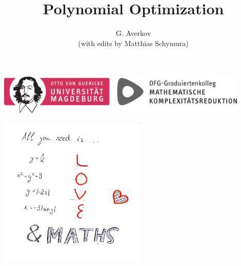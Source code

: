 \documentclass[a4paper,11pt]{article}
\title{\Huge Polynomial Optimization}
\author{\Large G. Averkov\\ (with edits by Matthias Schymura)}
\numberwithin{equation}{section}
\begin{document}

\maketitle

\hspace{3ex}

	\begin{center}
		\includegraphics[width=12cm]{logoCoreOVGUText.png}
	\end{center}

\hspace{3ex}


\begin{framed}
\begin{center}
\includegraphics[width=7cm]{love_maths.png}
\end{center}
\end{framed}


\clearpage

\tableofcontents

\clearpage


\clearpage 


\clearpage


\clearpage 


\clearpage 



\clearpage


\clearpage





%
\end{document}
